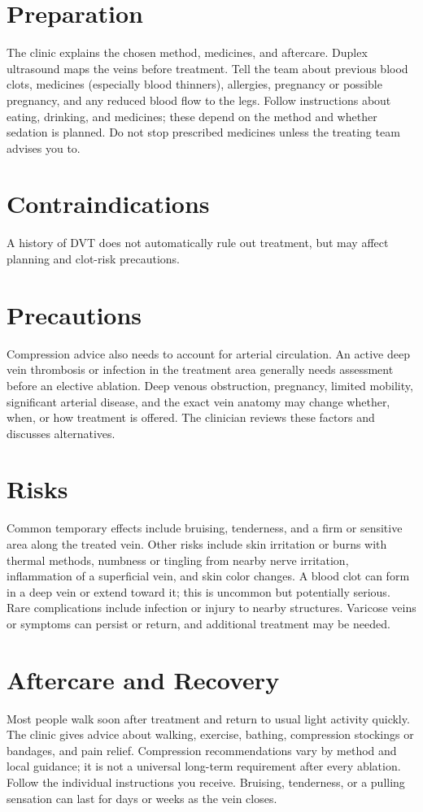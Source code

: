 \section*{Preparation}
The clinic explains the chosen method, medicines, and aftercare. Duplex ultrasound maps the veins before treatment. Tell the team about previous blood clots, medicines (especially blood thinners), allergies, pregnancy or possible pregnancy, and any reduced blood flow to the legs. Follow instructions about eating, drinking, and medicines; these depend on the method and whether sedation is planned. Do not stop prescribed medicines unless the treating team advises you to.

\section*{Contraindications}
A history of DVT does not automatically rule out treatment, but may affect planning and clot-risk precautions.

\section*{Precautions}
Compression advice also needs to account for arterial circulation. An active deep vein thrombosis or infection in the treatment area generally needs assessment before an elective ablation. Deep venous obstruction, pregnancy, limited mobility, significant arterial disease, and the exact vein anatomy may change whether, when, or how treatment is offered. The clinician reviews these factors and discusses alternatives.

\section*{Risks}
Common temporary effects include bruising, tenderness, and a firm or sensitive area along the treated vein. Other risks include skin irritation or burns with thermal methods, numbness or tingling from nearby nerve irritation, inflammation of a superficial vein, and skin color changes. A blood clot can form in a deep vein or extend toward it; this is uncommon but potentially serious. Rare complications include infection or injury to nearby structures. Varicose veins or symptoms can persist or return, and additional treatment may be needed.

\section*{Aftercare and Recovery}
Most people walk soon after treatment and return to usual light activity quickly. The clinic gives advice about walking, exercise, bathing, compression stockings or bandages, and pain relief. Compression recommendations vary by method and local guidance; it is not a universal long-term requirement after every ablation. Follow the individual instructions you receive. Bruising, tenderness, or a pulling sensation can last for days or weeks as the vein closes.

